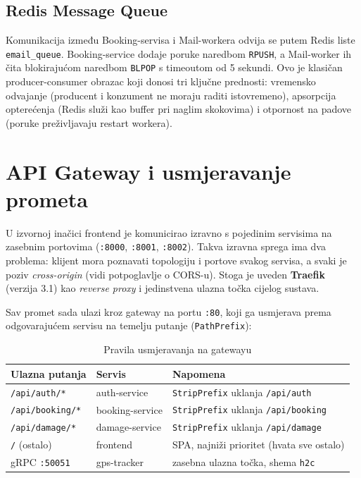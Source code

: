 \documentclass[12pt,a4paper]{article}
\begin{document}
\subsection{Redis Message Queue}

Komunikacija između Booking-servisa i Mail-workera odvija se putem Redis liste \texttt{email\_queue}. Booking-service dodaje poruke naredbom \texttt{RPUSH}, a Mail-worker ih čita blokirajućom naredbom \texttt{BLPOP} s timeoutom od 5 sekundi. Ovo je klasičan producer-consumer obrazac koji donosi tri ključne prednosti: vremensko odvajanje (producent i konzument ne moraju raditi istovremeno), apsorpcija opterećenja (Redis služi kao buffer pri naglim skokovima) i otpornost na padove (poruke preživljavaju restart workera).

\section{API Gateway i usmjeravanje prometa}

U izvornoj inačici frontend je komunicirao izravno s pojedinim servisima na zasebnim portovima (\texttt{:8000}, \texttt{:8001}, \texttt{:8002}). Takva izravna sprega ima dva problema: klijent mora poznavati topologiju i portove svakog servisa, a svaki je poziv \emph{cross-origin} (vidi potpoglavlje o CORS-u). Stoga je uveden \textbf{Traefik} (verzija 3.1) kao \emph{reverse proxy} i jedinstvena ulazna točka cijelog sustava.

Sav promet sada ulazi kroz gateway na portu \texttt{:80}, koji ga usmjerava prema odgovarajućem servisu na temelju putanje (\texttt{PathPrefix}):

\begin{table}[H]
\centering
\caption{Pravila usmjeravanja na gatewayu}
\label{tab:routing}
\begin{tabularx}{\textwidth}{l l X}
\toprule
\textbf{Ulazna putanja} & \textbf{Servis} & \textbf{Napomena} \\
\midrule
\texttt{/api/auth/*}    & auth-service    & \texttt{StripPrefix} uklanja \texttt{/api/auth} \\
\texttt{/api/booking/*} & booking-service & \texttt{StripPrefix} uklanja \texttt{/api/booking} \\
\texttt{/api/damage/*}  & damage-service  & \texttt{StripPrefix} uklanja \texttt{/api/damage} \\
\texttt{/} (ostalo)     & frontend        & SPA, najniži prioritet (hvata sve ostalo) \\
gRPC \texttt{:50051}    & gps-tracker     & zasebna ulazna točka, shema \texttt{h2c} \\
\bottomrule
\end{tabularx}
\end{table}
\end{document}
